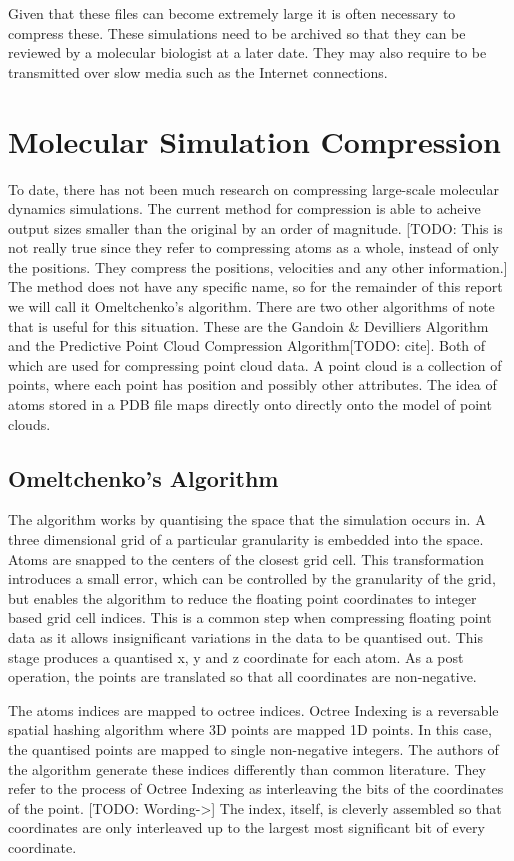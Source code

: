 \documentclass[a4paper,11pt]{report}
\begin{document}
Given that these files can become extremely large it is often necessary to compress these. These simulations need to be archived so that they can be reviewed by a molecular biologist at a later date. They may also require to be transmitted over slow media such as the Internet connections.

\section{Molecular Simulation Compression}
\label{back_msc}
To date, there has not been much research on compressing large-scale molecular dynamics simulations. The current method for compression is able to acheive output sizes smaller than the original by an order of magnitude. \cite{RefWorks:3}[TODO: This is not really true since they refer to compressing atoms as a whole, instead of only the positions. They compress the positions, velocities and any other information.] The method does not have any specific name, so for the remainder of this report we will call it Omeltchenko's algorithm. There are two other algorithms of note that is useful for this situation. These are the Gandoin \& Devilliers Algorithm and the Predictive Point Cloud Compression Algorithm[TODO: cite]. Both of which are used for compressing point cloud data. A point cloud is a collection of points, where each point has position and possibly other attributes. The idea of atoms stored in a PDB file maps directly onto directly onto the model of point clouds.

\subsection{Omeltchenko's Algorithm}

The algorithm works by quantising the space that the simulation occurs in. A three dimensional grid of a particular granularity is embedded into the space. Atoms are snapped to the centers of the closest grid cell. This transformation introduces a small error, which can be controlled by the granularity of the grid, but enables the algorithm to reduce the floating point coordinates to integer based grid cell indices. This is a common step when compressing floating point data as it allows insignificant variations in the data to be quantised out. This stage produces a quantised x, y and z coordinate for each atom. As a post operation, the points are translated so that all coordinates are non-negative.

The atoms indices are mapped to octree indices. Octree Indexing is a reversable spatial hashing algorithm where 3D points are mapped 1D points. In this case, the quantised points are mapped to single non-negative integers. The authors of the algorithm generate these indices differently than common literature. They refer to the process of Octree Indexing as interleaving the bits of the coordinates of the point. [TODO: Wording->] The index, itself, is cleverly assembled so that coordinates are only interleaved up to the largest most significant bit of every coordinate.
\end{document}
